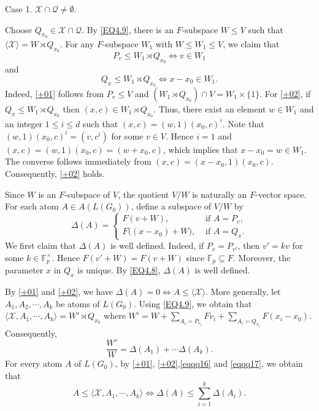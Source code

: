\documentclass[12pt]{article}
\begin{document}
Case 1. $\mathcal{X}\cap \mathcal{Q}\neq \emptyset$. 

Choose $Q_{x_0}\in \mathcal{X}\cap \mathcal{Q}$. By \eqref{EQ4.9}, there is an $F$-subspace $W\leq V$ such that 
$\langle \mathcal{X} \rangle=W\rtimes Q_{x_0}$.
For any $F$-subspace $W_1$ with $W\leq W_1\leq V$, we claim that
\begin{equation}\label{+01}
P_v\leq W_1\rtimes Q_{x_0} \Longleftrightarrow v\in W_1     
\end{equation}
and 
\begin{equation}\label{+02}
Q_x\leq W_1\rtimes Q_{x_0} \Longleftrightarrow x-x_0\in W_1 . \end{equation}
Indeed, \eqref{+01} follows from $P_v\leq V$ and $(W_1\rtimes Q_{x_0})\cap V=W_1\times\{1\}$. For \eqref{+02}, if $Q_x\leq W_1\rtimes Q_{x_0}$ 
then $(x,c)\in W_1\rtimes Q_{x_0}$. 
Thus, there exist an element $w\in W_1$ and an integer $1\leq i\leq d$ such 
that $(x,c)=(w,1)(x_0,c)^i$. Note that $(w,1)(x_0,c)^i=(v,c^i)$ for some $v\in V$. 
Hence $i=1$ and $(x,c)=(w,1)(x_0,c)=(w+x_0,c)$, which implies that  
$x-x_0=w\in W_1$. The converse follows immediately from 
$(x,c)=(x-x_0,1)(x_0,c)$. Consequently, \eqref{+02} holds.

Since $W$ is an $F$-subspace of $V$, the quotient $V/W$ is naturally an $F$-vector space. For each atom $A\in A(L(G_0))$, 
define a subspace of $V/W$ by
\begin{equation}\label{eqqq16} 
\Delta(A)=
\begin{cases}
F(v+W), &\mbox{ if }A=P_v,\\
F((x-x_0)+W\bigr), &\mbox{ if }A=Q_x.
\end{cases}
\end{equation}
We first claim that $\Delta(A)$ is well defined. Indeed, if $P_v=P_{v'}$, then
$v'=kv$ for some $k\in\mathbb{F}_p^\times$. Hence $F(v'+W)=F(v+W)$
since $\mathbb{F}_p\subseteq F$. Moreover, the parameter
$x$ in $Q_x$ is unique. By \eqref{EQ4.8}, $\Delta(A)$ is well defined.

By \eqref{+01} and \eqref{+02}, we have $\Delta(A)=0 \Longleftrightarrow  A\leq \langle \mathcal{X} \rangle$. 
More generally, let $A_1, A_2,\cdots,A_k$ be atoms of $L(G_0)$. Using \eqref{EQ4.9}, we obtain that 
$\langle \mathcal{X},A_1, \cdots,A_k\rangle=W'\rtimes Q_{x_0}$
where $W'=W+\sum_{A_i=P_{v_i}}Fv_{i}
+\sum_{A_i=Q_{x_i}}F({x_i-x_0})$.
Consequently,
\begin{equation}\label{eqqq17} 
\frac{W'}{W}=\Delta(A_1)+\cdots \Delta(A_k).
\end{equation}
For every atom $A$ of $L(G_0)$, by \eqref{+01}, \eqref{+02},\eqref{eqqq16} and \eqref{eqqq17}, we obtain that
\begin{equation}\label{eqqq18} 
A\leq \langle \mathcal{X},A_1, \cdots,A_k\rangle \Longleftrightarrow \Delta(A)\leq \sum^{k}_{i=1}\Delta(A_i).
\end{equation}
\end{document}
